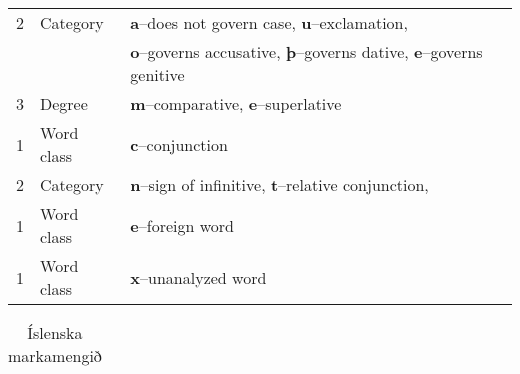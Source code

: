 \documentclass[11pt]{article}
\begin{document}
\begin{spacing}{1.0}
\begin{table}[h]
\begin{center}
{\begin{tabular}{lll}
2 & Category & {\bf a}--does not govern case, {\bf u}--exclamation, \\
  & & {\bf o}--governs accusative, {\bf þ}--governs dative, {\bf e}--governs genitive \\
3 & Degree & {\bf m}--comparative, {\bf e}--superlative \\
\hline
1 & Word class & {\bf c}--conjunction \\
2 & Category & {\bf n}--sign of infinitive, {\bf t}--relative conjunction, \\
\hline
1 & Word class & {\bf e}--foreign word\\
\hline
1 & Word class & {\bf x}--unanalyzed word \\
\hline
\hline
\end{tabular}
}
\end{center}
\end{table}

\newpage
\begin{table}[h]
\begin{center}
{\scriptsize
\caption{Íslenska markamengið}
\begin{tabular}{lll}
\hline
\hline


\end{tabular}}
\end{center}
\end{table}
\end{spacing}
\end{document}
